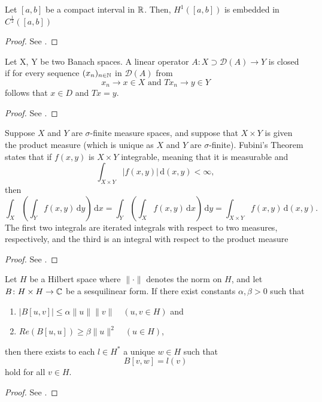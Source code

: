 \begin{atheorem} \label{embhc}
	Let $[a, b]$ be a compact interval in $\mathbb{R}$. Then, $H^{1}([a, b])$ is embedded in $C^{\frac{1}{2}}([a, b])$
	
	\begin{proof}
		See \cite[p. 269]{evans1998partial}.
	\end{proof}
\end{atheorem}

\begin{atheorem}
	Let X, Y be two Banach spaces. A linear operator $A \colon X \supset \mathcal{D}(A)  \rightarrow Y$ is closed if for every sequence $(x_n)_{n \in \mathbb{N}}$ in $\mathcal{D}(A)$ from
	\[ x_{n} \rightarrow x \in X \text{ and } Tx_{n} \rightarrow y \in Y \]
	follows that $x \in D$ and $Tx = y$.

	\begin{proof}
		 See \cite[p. 156]{werner2006funkana}.
	\end{proof}
\end{atheorem}	

\begin{atheorem} \label{athm:fubini}
	Suppose $X$ and $Y$ are $\sigma$-finite measure spaces, and suppose that $X \times Y$ is given the product measure (which is unique as $X$ and $Y$ are $\sigma$-finite). Fubini's Theorem states that if $f(x,y)$ is $X \times Y$ integrable, meaning that it is measurable and
		\[  \int_{X\times Y} |f(x,y)|\,\text{d}(x,y)<\infty, \]
	then
		\[ \int_X\left(\int_Y f(x,y)\,\text{d}y\right)\,\text{d}x=\int_Y\left(\int_X f(x,y)\,\text{d}x\right)\,\text{d}y=\int_{X\times Y} f(x,y)\,\text{d}(x,y). \]
	The first two integrals are iterated integrals with respect to two measures, respectively, and the third is an integral with respect to the product measure

	\begin{proof}
		See \cite[p. 514]{werner2006funkana}.
	\end{proof}
\end{atheorem}

\begin{atheorem} \label{athm:lm}
	Let $H$ be a Hilbert space where $\| \cdot \|$ denotes the norm on $H$, and let $B \colon H \times H \rightarrow \mathbb{C}$ be a sesquilinear form. If there exist constants $\alpha, \beta > 0$ such that
	\begin{enumerate}[label=\alph*\upshape)]
		\item $\left| B[u, v] \right| \leq \alpha \| u \| \|v \| \quad (u, v \in H)$ and
		\item $Re(B[u,u]) \geq \beta \|u\|^{2} \quad (u \in H)$,
	\end{enumerate}
	then there exists to each $l \in H^{*}$ a unique $w \in H$ such that
		\[ B[v, w] = l(v) \]
	hold for all $v \in H$.
		
	\begin{proof}
		See \cite[Amd to problem 51]{plum2015dglhr}.
	\end{proof}
\end{atheorem}

